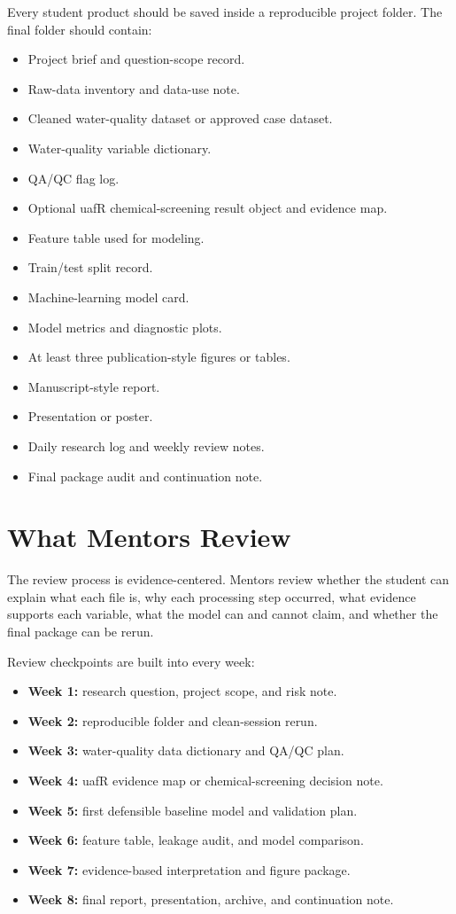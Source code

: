 Every student product should be saved inside a reproducible project folder. The final folder should contain:
\begin{itemize}
  \item Project brief and question-scope record.
  \item Raw-data inventory and data-use note.
  \item Cleaned water-quality dataset or approved case dataset.
  \item Water-quality variable dictionary.
  \item QA/QC flag log.
  \item Optional uafR chemical-screening result object and evidence map.
  \item Feature table used for modeling.
  \item Train/test split record.
  \item Machine-learning model card.
  \item Model metrics and diagnostic plots.
  \item At least three publication-style figures or tables.
  \item Manuscript-style report.
  \item Presentation or poster.
  \item Daily research log and weekly review notes.
  \item Final package audit and continuation note.
\end{itemize}

\section{What Mentors Review}

The review process is evidence-centered. Mentors review whether the student can explain what each file is, why each processing step occurred, what evidence supports each variable, what the model can and cannot claim, and whether the final package can be rerun.

Review checkpoints are built into every week:
\begin{itemize}
  \item \textbf{Week 1:} research question, project scope, and risk note.
  \item \textbf{Week 2:} reproducible folder and clean-session rerun.
  \item \textbf{Week 3:} water-quality data dictionary and QA/QC plan.
  \item \textbf{Week 4:} uafR evidence map or chemical-screening decision note.
  \item \textbf{Week 5:} first defensible baseline model and validation plan.
  \item \textbf{Week 6:} feature table, leakage audit, and model comparison.
  \item \textbf{Week 7:} evidence-based interpretation and figure package.
  \item \textbf{Week 8:} final report, presentation, archive, and continuation note.
\end{itemize}


